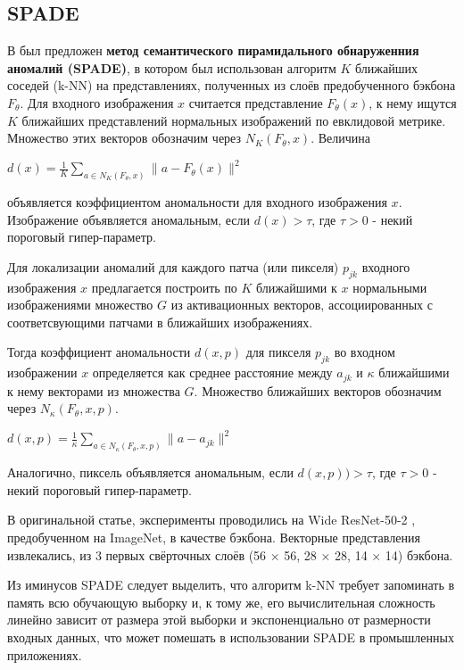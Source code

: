 \documentclass{article}
\begin{document}
\begin{large}
\subsection{SPADE}

В \cite{spade} был предложен \textbf{метод семантического пирамидального обнаруженния аномалий (SPADE)}, в котором был использован алгоритм $K$ ближайших соседей (k-NN) на представлениях, полученных из слоёв предобученного бэкбона $F_\theta$. Для входного изображения $x$ считается представление $F_\theta(x)$, к нему ищутся $K$ ближайших представлений нормальных изображений по евклидовой метрике. Множество этих векторов обозначим через $N_K(F_\theta, x)$. Величина
\begin{center}
	$d(x) = \frac{1}{K} \sum\limits_{a \in N_K(F_\theta, x)} \|a - F_\theta(x) \|^2$
\end{center}
объявляется коэффициентом аномальности для входного изображения $x$. Изображение объявляется аномальным, если $d(x) > \tau$, где $\tau > 0$ - некий пороговый гипер-параметр.

Для локализации аномалий для каждого патча (или пикселя) $p_{jk}$ входного изображения $x$ предлагается построить по $K$ ближайшими к $x$ нормальными изображениями множество $G$ из активационных векторов, ассоциированных с соответсвующими патчами в ближайших изображениях.

Тогда коэффициент аномальности $d(x, p)$ для пикселя $p_{jk}$ во входном изображении $x$ определяется как среднее расстояние между $a_{jk}$ и $\kappa$ ближайшими к нему векторами из множества $G$. Множество ближайших векторов обозначим через $N_\kappa(F_\theta, x, p)$.
\begin{center}
	$d(x, p) = \frac{1}{\kappa} \sum\limits_{a \in N_\kappa(F_\theta, x, p)} \|a - a_{jk} \|^2$
\end{center}
Аналогично, пиксель объявляется аномальным, если $d(x, p)) > \tau$, где $\tau > 0$ - некий пороговый гипер-параметр.

В оригинальной статье, эксперименты проводились на Wide ResNet-50-2 \cite{wide}, предобученном на ImageNet, в качестве бэкбона. Векторные представления извлекались, из 3 первых свёрточных слоёв (56 × 56, 28 × 28, 14 × 14) бэкбона.

Из иминусов SPADE следует выделить, что алгоритм k-NN требует запоминать в память всю обучающую выборку и, к тому же, его вычислительная сложность линейно зависит от размера этой выборки и экспоненциально от размерности входных данных, что может помешать в использовании SPADE в промышленных приложениях.


\end{large}
\end{document}
